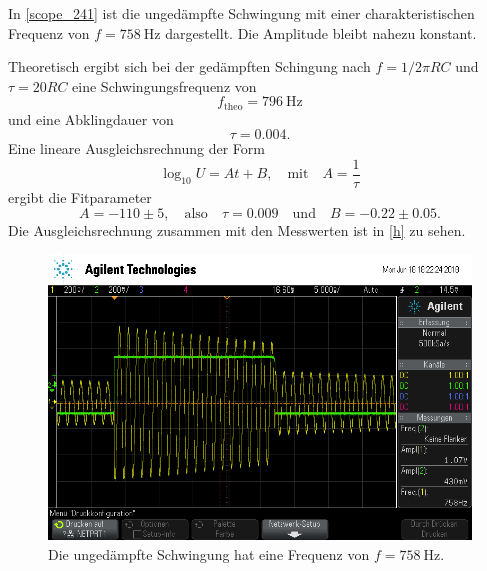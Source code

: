 In \autoref{scope_241} ist die ungedämpfte Schwingung mit einer charakteristischen Frequenz von $f = \SI{758}{\hertz}$ dargestellt. Die Amplitude bleibt nahezu konstant.\par
Theoretisch ergibt sich bei der gedämpften Schingung nach $f = 1 / 2\pi RC$ und $\tau = 20RC$ eine Schwingungsfrequenz von
\begin{equation*}
	f_\text{theo} = \SI{796}{\hertz}
\end{equation*}
und eine Abklingdauer von
\begin{equation*}
	\tau = 0.004.
\end{equation*}
Eine lineare Ausgleichsrechnung der Form
\begin{equation}
	\log_{10} U = At + B, \quad \text{mit} \quad A = \frac{1}{\tau}
\end{equation}
ergibt die Fitparameter
\begin{equation*}
	A = -110 \pm 5, \quad \text{also} \quad \tau = 0.009 \quad \text{und} \quad B = -0.22 \pm 0.05.
\end{equation*}
Die Ausgleichsrechnung zusammen mit den Messwerten ist in \autoref{h} zu sehen.
\begin{figure}[h]
	\centering
	\includegraphics[width=\textwidth]{usb/scope_241.png}
	\caption{Die ungedämpfte Schwingung hat eine Frequenz von $f = \SI{758}{\hertz}$.}
	\label{scope_241}
\end{figure}
